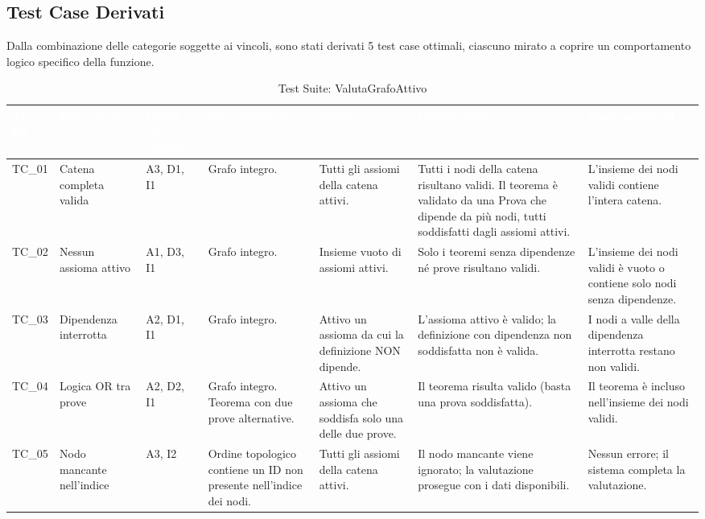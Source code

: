 \documentclass[12pt,a4paper]{article}
\begin{document}
\subsection{Test Case Derivati}
Dalla combinazione delle categorie soggette ai vincoli, sono stati derivati 5 test case ottimali, ciascuno mirato a coprire un comportamento logico specifico della funzione.

\begin{table}[H]
    \centering
    \footnotesize
    \begin{tabularx}{\textwidth}{|p{1.2cm}|p{2cm}|p{1.8cm}|X|p{2cm}|X|X|}
        \hline
        \rowcolor{PrimaryBlue} \textcolor{white}{\textbf{TC ID}} & \textcolor{white}{\textbf{Descrizione}} & \textcolor{white}{\textbf{Classi eq. coperte}} & \textcolor{white}{\textbf{Pre-condizioni}} & \textcolor{white}{\textbf{Input}} & \textcolor{white}{\textbf{Output attesi}} & \textcolor{white}{\textbf{Post-condizioni}} \\
        \hline
        TC\_01 & Catena completa valida & A3, D1, I1 & Grafo integro. & Tutti gli assiomi della catena attivi. & Tutti i nodi della catena risultano validi. Il teorema è validato da una Prova che dipende da più nodi, tutti soddisfatti dagli assiomi attivi. & L'insieme dei nodi validi contiene l'intera catena. \\
        \hline
        \rowcolor{CodeBg} TC\_02 & Nessun assioma attivo & A1, D3, I1 & Grafo integro. & Insieme vuoto di assiomi attivi. & Solo i teoremi senza dipendenze né prove risultano validi. & L'insieme dei nodi validi è vuoto o contiene solo nodi senza dipendenze. \\
        \hline
        TC\_03 & Dipendenza interrotta & A2, D1, I1 & Grafo integro. & Attivo un assioma da cui la definizione NON dipende. & L'assioma attivo è valido; la definizione con dipendenza non soddisfatta non è valida. & I nodi a valle della dipendenza interrotta restano non validi. \\
        \hline
        \rowcolor{CodeBg} TC\_04 & Logica OR tra prove & A2, D2, I1 & Grafo integro. Teorema con due prove alternative. & Attivo un assioma che soddisfa solo una delle due prove. & Il teorema risulta valido (basta una prova soddisfatta). & Il teorema è incluso nell'insieme dei nodi validi. \\
        \hline
        TC\_05 & Nodo mancante nell'indice & A3, I2 & Ordine topologico contiene un ID non presente nell'indice dei nodi. & Tutti gli assiomi della catena attivi. & Il nodo mancante viene ignorato; la valutazione prosegue con i dati disponibili. & Nessun errore; il sistema completa la valutazione. \\
        \hline
    \end{tabularx}
    \caption{Test Suite: ValutaGrafoAttivo}
\end{table}
\end{document}
